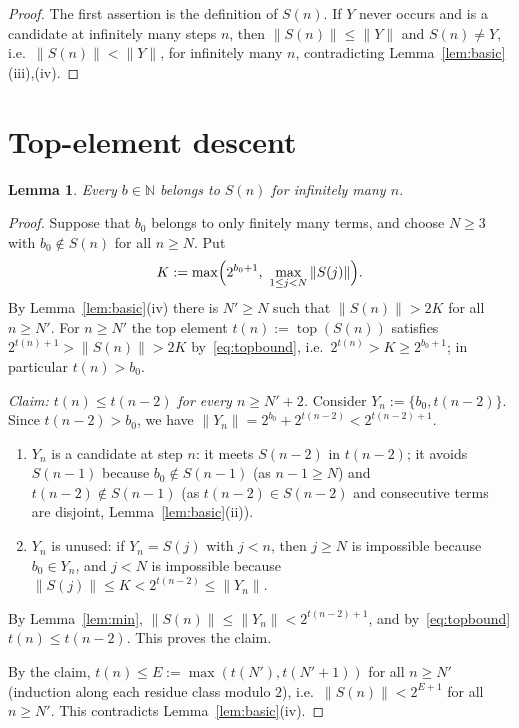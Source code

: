 \documentclass[11pt]{amsart}
\newtheorem{lemma}{Lemma}[section]
\theoremstyle{definition}
\theoremstyle{remark}
\newcommand{\N}{\mathbb{N}}
\newcommand{\topel}{\operatorname{top}}
\begin{document}
\begin{proof}
The first assertion is the definition of $S(n)$. If $Y$ never occurs and is a candidate at
infinitely many steps $n$, then $\|S(n)\|\le\|Y\|$ and $S(n)\neq Y$, i.e.\ $\|S(n)\|<\|Y\|$, for
infinitely many $n$, contradicting Lemma~\ref{lem:basic}(iii),(iv).
\end{proof}

\section{Top-element descent}\label{sec:descent}

\begin{lemma}\label{lem:recur}
Every $b\in\N$ belongs to $S(n)$ for infinitely many $n$.
\end{lemma}

\begin{proof}
Suppose that $b_0$ belongs to only finitely many terms, and choose $N\ge3$ with $b_0\notin S(n)$
for all $n\ge N$. Put
\[
K:=\max\Bigl(2^{b_0+1},\ \max_{1\le j<N}\|S(j)\|\Bigr).
\]
By Lemma~\ref{lem:basic}(iv) there is $N'\ge N$ such that $\|S(n)\|>2K$ for all $n\ge N'$. For
$n\ge N'$ the top element $t(n):=\topel(S(n))$ satisfies $2^{t(n)+1}>\|S(n)\|>2K$
by~\eqref{eq:topbound}, i.e.\ $2^{t(n)}>K\ge 2^{b_0+1}$; in particular $t(n)>b_0$.

\emph{Claim: $t(n)\le t(n-2)$ for every $n\ge N'+2$.} Consider $Y_n:=\{b_0,t(n-2)\}$. Since
$t(n-2)>b_0$, we have $\|Y_n\|=2^{b_0}+2^{t(n-2)}<2^{t(n-2)+1}$.
\begin{enumerate}[label=\textup{(\alph*)},leftmargin=2em]
\item $Y_n$ is a candidate at step $n$: it meets $S(n-2)$ in $t(n-2)$; it avoids $S(n-1)$ because
$b_0\notin S(n-1)$ (as $n-1\ge N$) and $t(n-2)\notin S(n-1)$ (as $t(n-2)\in S(n-2)$ and
consecutive terms are disjoint, Lemma~\ref{lem:basic}(ii)).
\item $Y_n$ is unused: if $Y_n=S(j)$ with $j<n$, then $j\ge N$ is impossible because $b_0\in Y_n$,
and $j<N$ is impossible because $\|S(j)\|\le K<2^{t(n-2)}\le\|Y_n\|$.
\end{enumerate}
By Lemma~\ref{lem:min}, $\|S(n)\|\le\|Y_n\|<2^{t(n-2)+1}$, and by~\eqref{eq:topbound}
$t(n)\le t(n-2)$. This proves the claim.

By the claim, $t(n)\le E:=\max(t(N'),t(N'+1))$ for all $n\ge N'$ (induction along each residue
class modulo $2$), i.e.\ $\|S(n)\|<2^{E+1}$ for all $n\ge N'$. This contradicts
Lemma~\ref{lem:basic}(iv).
\end{proof}
\end{document}
